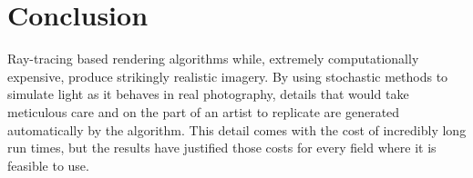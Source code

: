 \documentclass[10pt]{IEEEtran}
\begin{document}
\section*{Conclusion}

Ray-tracing based rendering algorithms while, extremely computationally expensive, produce
strikingly realistic imagery. By using stochastic methods to simulate light as it behaves in real
photography, details that would take meticulous care and on the part of an artist to replicate are
generated automatically by the algorithm. This detail comes with the cost of incredibly long run
times, but the results have justified those costs for every field where it is feasible to use.

\printbibliography

\end{document}

